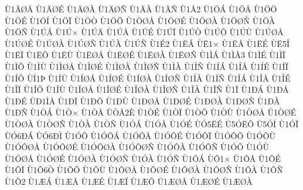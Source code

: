 {^^d91^^c4^^d8^^c5
^^d91^^c4^^d8^^c9
^^d91^^c4^^d8^^c0
^^d91^^c4^^d8^^d1
^^d91^^c4^^c0
^^d91^^c4^^d1
^^d91^^c52
^^d91^^d6^^c1
^^d91^^d6^^c5
^^d91^^d6^^d6
^^d91^^d6^^c9
^^d91^^d6^^cd
^^d91^^d6^^cf
^^d91^^d6^^d2
^^d91^^d6^^d5
^^d91^^d6^^d8^^c5
^^d91^^d6^^d8^^c9
^^d91^^d6^^d8^^c0
^^d91^^d6^^d8^^d1
^^d91^^d6^^c0
^^d91^^d6^^d1
^^d91^^da^^c1
^^d91^^da^^d7
^^d91^^da^^c4
^^d91^^da^^c5
^^d91^^da^^c9
^^d91^^da^^cf
^^d91^^da^^d2
^^d91^^da^^d5
^^d91^^da^^d9
^^d91^^da^^d8^^c5
^^d91^^da^^d8^^c9
^^d91^^da^^d8^^c0
^^d91^^da^^d8^^d1
^^d91^^da^^c0
^^d91^^da^^d1
^^d91^^c92
^^d91^^cb^^c1
^^d9^^cb1^^d7
^^d91^^cb^^c5
^^d91^^cb^^c9
^^d9^^cb5^^ce
^^d91^^cb^^cf
^^d91^^cb^^d5
^^d91^^cb^^d9
^^d91^^cb^^d8^^c5
^^d91^^cb^^d8^^c9
^^d91^^cb^^d8^^c0
^^d91^^cb^^d8^^d1
^^d91^^cc^^c1
^^d91^^cc^^c53
^^d91^^cc^^c9
^^d91^^cc^^cf
^^d91^^cc^^d5
^^d91^^cc^^d9
^^d91^^cc^^d8^^c5
^^d91^^cc^^d8^^c9
^^d91^^cc^^d8^^c0
^^d91^^cc^^d8^^d1
^^d91^^cc^^c0
^^d91^^cc^^d1
^^d91^^cd^^c1
^^d91^^cd^^c5
^^d91^^cd^^c9
^^d91^^cd^^cf
^^d91^^cd^^d5
^^d9^^cd1^^de
^^d91^^cd^^d9
^^d91^^cd^^d8^^c5
^^d91^^cd^^d8^^c9
^^d91^^cd^^d8^^c0
^^d91^^cd^^d8^^d1
^^d91^^cd^^c0
^^d91^^cd^^d1
^^d91^^ce^^c1
^^d91^^ce^^c5
^^d91^^ce^^c9
^^d91^^ce^^cf
^^d91^^ce^^d5
^^d91^^ce^^d9
^^d91^^ce^^d8^^c5
^^d91^^ce^^d8^^c9
^^d91^^ce^^d8^^c0
^^d91^^ce^^d8^^d1
^^d91^^ce^^c0
^^d91^^ce^^d1
^^d91^^cf
^^d91^^d0^^c1
^^d91^^d0^^c5
^^d91^^d0^^c9
^^d9^^d01^^cc^^c5
^^d91^^d0^^cf
^^d91^^d0^^d5
^^d91^^d0^^d9
^^d91^^d0^^d8^^c5
^^d91^^d0^^d8^^c9
^^d91^^d0^^d8^^c0
^^d91^^d0^^d8^^d1
^^d91^^d0^^c0
^^d91^^d0^^d1
^^d91^^d2^^c1
^^d91^^d2^^d7
^^d91^^d2^^c5
^^d9^^d2^^c52^^c8
^^d91^^d2^^c9
^^d91^^d2^^cf
^^d91^^d2^^d5
^^d91^^d2^^d9
^^d91^^d2^^d8^^c5
^^d91^^d2^^d8^^c9
^^d91^^d2^^d8^^c0
^^d91^^d2^^d8^^d1
^^d91^^d2^^c0
^^d91^^d2^^d1
^^d91^^d3^^c1
^^d91^^d3^^c5
^^d91^^d3^^c9
^^d9^^d35^^cb^^c9
^^d95^^d3^^cb^^d5
^^d95^^d3^^cd
^^d91^^d3^^cf
^^d9^^d36^^d0^^c1
^^d9^^d36^^d0^^cc
^^d91^^d3^^d4
^^d91^^d3^^d4^^c1
^^d91^^d3^^d4^^c5
^^d91^^d3^^d4^^c9
^^d91^^d3^^d4^^cf
^^d91^^d3^^d4^^d5
^^d91^^d3^^d4^^d9
^^d91^^d3^^d4^^d8^^c5
^^d91^^d3^^d4^^d8^^c9
^^d91^^d3^^d4^^d8^^c0
^^d91^^d3^^d4^^d8^^d1
^^d91^^d3^^d4^^c0
^^d91^^d3^^d4^^d1
^^d91^^d3^^d5
^^d91^^d3^^d9
^^d91^^d3^^d8^^c5
^^d91^^d3^^d8^^c9
^^d91^^d3^^d8^^c0
^^d91^^d3^^d8^^d1
^^d91^^d3^^c0
^^d91^^d3^^d1
^^d91^^d4^^c1
^^d9^^d41^^d7
^^d91^^d4^^c5
^^d91^^d4^^c9
^^d91^^d4^^cf
^^d91^^d46^^d2
^^d91^^d4^^d5
^^d91^^d4^^d9
^^d91^^d4^^d8^^c5
^^d91^^d4^^d8^^c9
^^d91^^d4^^d8^^c0
^^d91^^d4^^d8^^d1
^^d91^^d4^^c0
^^d91^^d4^^d1
^^d91^^d52
^^d91^^c6^^c1
^^d91^^c6^^c5
^^d91^^c6^^c9
^^d91^^c6^^cf
^^d91^^c6^^d5
^^d91^^c6^^d8^^c5
^^d91^^c6^^d8^^c9
^^d91^^c6^^d8^^c0
}
